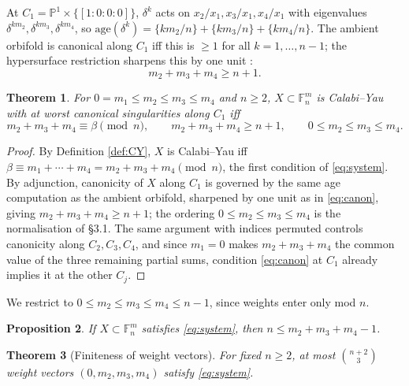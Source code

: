 \documentclass[11pt]{article}
\newtheorem{theorem}{Theorem}[section]
\newtheorem{proposition}[theorem]{Proposition}
\newcommand{\PP}{\mathbb{P}}
\begin{document}
	At $C_1=\PP^1\times\{[1:0:0:0]\}$, $\delta^k$ acts on $x_2/x_1,x_3/x_1,x_4/x_1$ with eigenvalues $\delta^{km_2},\delta^{km_3},\delta^{km_4}$, so $\mathrm{age}(\delta^k)=\{km_2/n\}+\{km_3/n\}+\{km_4/n\}$. The ambient orbifold is canonical along $C_1$ iff this is $\ge1$ for all $k=1,\dots,n-1$; the hypersurface restriction sharpens this by one unit \cite[Thm.\ 4.6]{Reid1985}:
	\begin{equation}\label{eq:canon}
		m_2+m_3+m_4\ge n+1.
	\end{equation}
	
	\begin{theorem}\label{thm:system}
		For $0=m_1\le m_2\le m_3\le m_4$ and $n\ge2$, $X\subset\mathbb{F}^m_n$ is Calabi--Yau with at worst canonical singularities along $C_1$ iff
		\begin{equation}\label{eq:system}
			m_2+m_3+m_4\equiv\beta\pmod n,\qquad m_2+m_3+m_4\ge n+1,\qquad 0\le m_2\le m_3\le m_4.
		\end{equation}
	\end{theorem}
	
	\begin{proof}
		By Definition \ref{def:CY}, $X$ is Calabi--Yau iff $\beta\equiv m_1+\cdots+m_4=m_2+m_3+m_4\pmod n$, the first condition of \eqref{eq:system}. By adjunction, canonicity of $X$ along $C_1$ is governed by the same age computation as the ambient orbifold, sharpened by one unit as in \eqref{eq:canon}, giving $m_2+m_3+m_4\ge n+1$; the ordering $0\le m_2\le m_3\le m_4$ is the normalisation of \S3.1. The same argument with indices permuted controls canonicity along $C_2,C_3,C_4$, and since $m_1=0$ makes $m_2+m_3+m_4$ the common value of the three remaining partial sums, condition \eqref{eq:canon} at $C_1$ already implies it at the other $C_j$.
	\end{proof}
	
	We restrict to $0\le m_2\le m_3\le m_4\le n-1$, since weights enter only mod $n$.
	
	\begin{proposition}\label{prop:nbound}
		If $X\subset\mathbb{F}^m_n$ satisfies \eqref{eq:system}, then $n\le m_2+m_3+m_4-1$.
	\end{proposition}
	
	\begin{theorem}[Finiteness of weight vectors]\label{thm:finiteweights}
		For fixed $n\ge2$, at most $\binom{n+2}{3}$ weight vectors $(0,m_2,m_3,m_4)$ satisfy \eqref{eq:system}.
	\end{theorem}
	
\end{document}
